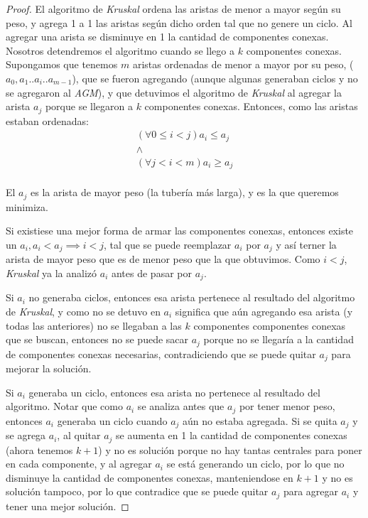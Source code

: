 \begin{proof}
	El algoritmo de \emph{Kruskal} ordena las aristas de menor a mayor seg\'un su peso, y agrega 1 a 1 las aristas seg\'un dicho orden tal que no genere un ciclo. Al agregar una arista se disminuye en 1 la cantidad de componentes conexas.  Nosotros detendremos el algoritmo cuando se llego a $k$ componentes conexas.
	Supongamos que tenemos $m$ aristas ordenadas de menor a mayor por su peso, ($a_0, a_1 .. a_i .. a_{m-1}$), que se fueron agregando (aunque algunas generaban ciclos y no se agregaron al \emph{AGM}), y que detuvimos el algoritmo de \emph{Kruskal} al agregar la arista $a_j$ porque se llegaron a $k$ componentes conexas. Entonces, como las aristas estaban ordenadas:
	\begin{equation*}
	\begin{split}
		(\forall 0 \leq i < j) a_i \leq a_j \\
		\land \\
		(\forall j < i < m) a_i \geq a_j \\
	\end{split}
	\end{equation*}

	El $a_j$ es la arista de mayor peso (la tuber\'ia m\'as larga), y es la que queremos minimiza.

	Si existiese una mejor forma de armar las componentes conexas, entonces existe un $a_i, a_i < a_j \implies i < j$, tal que se puede reemplazar $a_i$ por $a_j$ y as\'i terner la arista de mayor peso que es de menor peso que la que obtuvimos. Como $i < j$, \emph{Kruskal} ya la analiz\'o $a_i$ antes de pasar por $a_j$.

	Si $a_i$ no generaba ciclos, entonces esa arista pertenece al resultado del algoritmo de \emph{Kruskal}, y como no se detuvo en $a_i$ significa que a\'un agregando esa arista (y todas las anteriores) no se llegaban a las $k$ componentes componentes conexas que se buscan, entonces no se puede sacar $a_j$ porque no se llegar\'ia a la cantidad de componentes conexas necesarias, contradiciendo que se puede quitar $a_j$ para mejorar la soluci\'on.

	Si $a_i$ generaba un ciclo, entonces esa arista no pertenece al resultado del algoritmo. Notar que como $a_i$ se analiza antes que $a_j$ por tener menor peso, entonces $a_i$ generaba un ciclo cuando $a_j$ a\'un no estaba agregada. Si se quita $a_j$ y se agrega $a_i$, al quitar $a_j$ se aumenta en 1 la cantidad de componentes conexas (ahora tenemos $k + 1$) y no es soluci\'on porque no hay tantas centrales para poner en cada componente, y al agregar $a_i$ se est\'a generando un ciclo, por lo que no disminuye la cantidad de componentes conexas, manteniendose en $k + 1$ y no es soluci\'on tampoco, por lo que contradice que se puede quitar $a_j$ para agregar $a_i$ y tener una mejor soluci\'on.


\end{proof}
